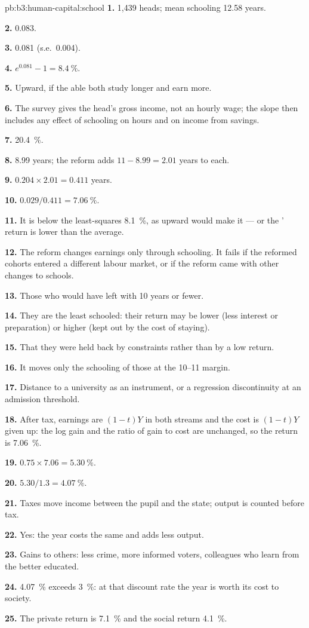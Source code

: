 \begin{solution}{pb:b3:human-capital:school}
\textbf{1.} 1{,}439 heads; mean schooling 12.58 years.

\textbf{2.} 0.083.

\textbf{3.} 0.081 (s.e.\ 0.004).

\textbf{4.} $e^{0.081} - 1 = 8.4~\%$.

\textbf{5.} Upward, if the able both study longer and earn more.

\textbf{6.} The survey gives the head's gross income, not an hourly wage; the slope then
includes any effect of schooling on hours and on income from savings.

\textbf{7.} 20.4~\%.

\textbf{8.} 8.99 years; the reform adds $11 - 8.99 = 2.01$ years to each.

\textbf{9.} $0.204 \times 2.01 = 0.411$ years.

\textbf{10.} $0.029/0.411 = 7.06~\%$.

\textbf{11.} It is below the least-squares 8.1~\%, as upward  would make it --- or
the ' return is lower than the average.

\textbf{12.} The reform changes earnings only through schooling. It fails if the
reformed cohorts entered a different labour market, or if the reform came with
other changes to schools.

\textbf{13.} Those who would have left with 10 years or fewer.

\textbf{14.} They are the least schooled: their return may be lower (less interest or
preparation) or higher (kept out by the cost of staying).

\textbf{15.} That they were held back by constraints rather than by a low return.

\textbf{16.} It moves only the schooling of those at the 10--11 margin.

\textbf{17.} Distance to a university as an instrument, or a regression discontinuity
at an admission threshold.

\textbf{18.} After tax, earnings are $(1 - t)Y$ in both streams and the cost is $(1 - t)Y$ given up: the
log gain and the ratio of gain to cost are unchanged, so the return is 7.06~\%.

\textbf{19.} $0.75 \times 7.06 = 5.30~\%$.

\textbf{20.} $5.30/1.3 = 4.07~\%$.

\textbf{21.} Taxes move income between the pupil and the state; output is counted
before tax.

\textbf{22.} Yes: the year costs the same and adds less output.

\textbf{23.} Gains to others: less crime, more informed voters, colleagues who learn
from the better educated.

\textbf{24.} 4.07~\% exceeds 3~\%: at that discount rate the year is worth its cost to society.

\textbf{25.} The private return is 7.1~\% and the social return 4.1~\%.
\end{solution}

